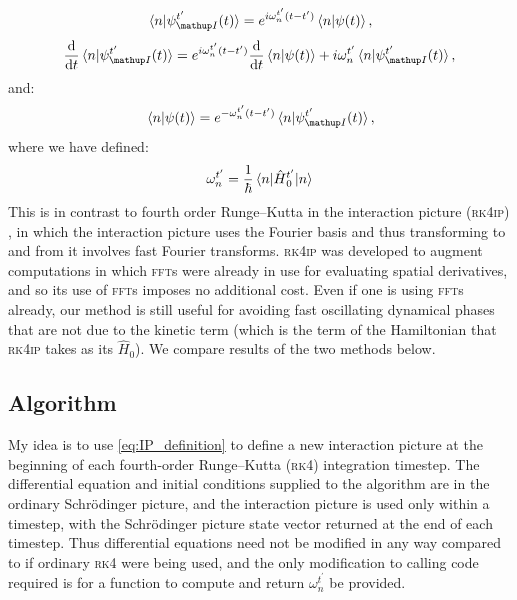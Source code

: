 \begin{align}\label{eq:IP_definition_components}
\braket{n}{\psi_\up{I}^{t^\prime}(t)} = e^{ i \omega_n^{t^\prime}(t - t^\prime)}\braket{n}{\psi(t)},
\end{align}
\begin{align}\label{eq:IPDE_components}
\dv t \braket{n}{\psi_\up{I}^{t^\prime}(t)}
    = e^{i \omega_n^{t^\prime}(t - t^\prime)}\dv t \braket{n}{\psi(t)}
      + i\omega_n^{t^\prime}\braket{n}{\psi_\up{I}^{t^\prime}(t)},
\end{align}
and:
\begin{align}\label{eq:backtransform_components}
\braket{n}{\psi(t)} = e^{-\omega_n^{t^\prime}(t - t^\prime)}\braket{n}{\psi_\up{I}^{t^\prime}(t)},
\end{align}
where we have defined:
\begin{align}\label{eq:omega}
\omega_n^{t^\prime} = \frac 1\hbar \matrixel{n}{\hat H_0^{t^\prime}}{n}
\end{align}
This is in contrast to fourth order Runge--Kutta in the interaction picture (\textsc{rk4ip}) \cite{caradoc_davies_thesis}, in which the interaction picture uses the Fourier basis and thus transforming to and from it involves fast Fourier transforms. \textsc{rk4ip} was developed to augment computations in which \textsc{fft}s were already in use for evaluating spatial derivatives, and so its use of \textsc{fft}s imposes no additional cost. Even if one is using \textsc{fft}s already, our method is still useful for avoiding fast oscillating dynamical phases that are not due to the kinetic term (which is the term of the Hamiltonian that \textsc{rk4ip} takes as its $\hat H_0$). We compare results of the two methods below.

\subsection{Algorithm}
My idea is to use \eqref{eq:IP_definition} to define a new interaction picture at the beginning of each fourth-order Runge–Kutta (\textsc{rk4}) integration timestep. The differential equation and initial conditions supplied to the algorithm are in the ordinary Schr\"odinger picture, and the interaction picture is used only within a timestep, with the Schrödinger picture state vector returned at the end of each timestep. Thus differential equations need not be modified in any way compared to if ordinary \textsc{rk4} were being used, and the only modification to calling code required is for a function to compute and return $\omega_n^{t^\prime}$ be provided.

